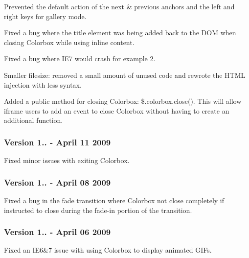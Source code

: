 \begin{DoxyItemize}
\item Prevented the default action of the next \& previous anchors and the left and right keys for gallery mode.
\item Fixed a bug where the title element was being added back to the D\-O\-M when closing Colorbox while using inline content.
\item Fixed a bug where I\-E7 would crash for example 2.
\item Smaller filesize\-: removed a small amount of unused code and rewrote the H\-T\-M\-L injection with less syntax.
\item Added a public method for closing Colorbox\-: \$.colorbox.\-close(). This will allow iframe users to add an event to close Colorbox without having to create an additional function.
\end{DoxyItemize}

\subsubsection*{Version 1.. -\/ April 11 2009}


\begin{DoxyItemize}
\item Fixed minor issues with exiting Colorbox.
\end{DoxyItemize}

\subsubsection*{Version 1.. -\/ April 08 2009}


\begin{DoxyItemize}
\item Fixed a bug in the fade transition where Colorbox not close completely if instructed to close during the fade-\/in portion of the transition.
\end{DoxyItemize}

\subsubsection*{Version 1.. -\/ April 06 2009}


\begin{DoxyItemize}
\item Fixed an I\-E6\&7 issue with using Colorbox to display animated G\-I\-Fs.
\end{DoxyItemize}

